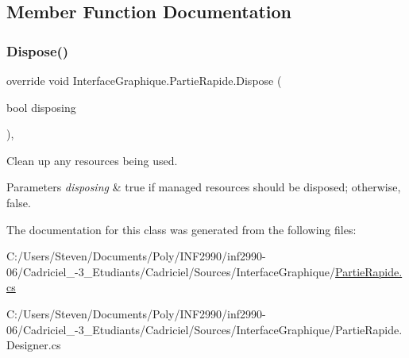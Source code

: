 \subsection{Member Function Documentation}
\hypertarget{class_interface_graphique_1_1_partie_rapide_a248957e40a9fe9d9ca2e3c90e117b192}{}\label{class_interface_graphique_1_1_partie_rapide_a248957e40a9fe9d9ca2e3c90e117b192} 
\subsubsection{\texorpdfstring{Dispose()}{Dispose()}}
{\footnotesize\ttfamily override void Interface\+Graphique.\+Partie\+Rapide.\+Dispose (\begin{DoxyParamCaption}\item[{bool}]{disposing }\end{DoxyParamCaption})\hspace{0.3cm}{\ttfamily [inline]}, {\ttfamily [protected]}}



Clean up any resources being used. 


\begin{DoxyParams}{Parameters}
{\em disposing} & true if managed resources should be disposed; otherwise, false.\\
\hline
\end{DoxyParams}


The documentation for this class was generated from the following files\+:\begin{DoxyCompactItemize}
\item 
C\+:/\+Users/\+Steven/\+Documents/\+Poly/\+I\+N\+F2990/inf2990-\/06/\+Cadriciel\+\_-\/3\+\_\+\+Etudiants/\+Cadriciel/\+Sources/\+Interface\+Graphique/\hyperlink{_partie_rapide_8cs}{Partie\+Rapide.\+cs}\item 
C\+:/\+Users/\+Steven/\+Documents/\+Poly/\+I\+N\+F2990/inf2990-\/06/\+Cadriciel\+\_-\/3\+\_\+\+Etudiants/\+Cadriciel/\+Sources/\+Interface\+Graphique/Partie\+Rapide.\+Designer.\+cs\end{DoxyCompactItemize}
